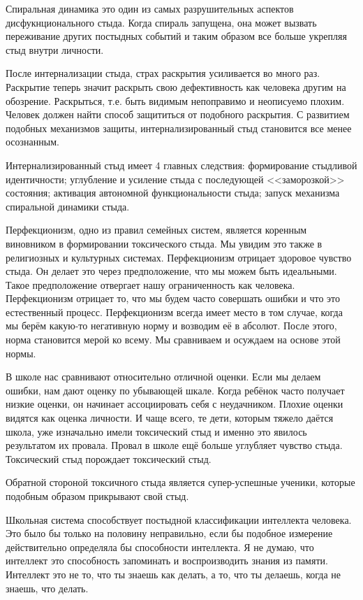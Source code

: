 \documentclass[10pt, fleqn]{article}
\begin{document}
Спиральная динамика это один из самых разрушительных аспектов дисфукнционального стыда. Когда спираль запущена, она может вызвать переживание других постыдных событий и таким образом все больше укрепляя стыд внутри личности.

После интернализации стыда, страх раскрытия усиливается во много раз. Раскрытие теперь значит раскрыть свою дефективность как человека другим на обозрение. Раскрыться, т.е. быть видимым непоправимо и неописуемо плохим. Человек должен найти способ защититься от подобного раскрытия. С развитием подобных механизмов защиты, интернализированный стыд становится все менее осознанным.

Интернализированный стыд имеет 4 главных следствия: формирование стыдливой идентичности; углубление и усиление стыда с последующей <<заморозкой>> состояния; активация автономной функциональности стыда; запуск механизма спиральной динамики стыда.




Перфекционизм, одно из правил семейных систем, является коренным виновником в формировании токсического стыда. Мы увидим это также в религиозных и культурных системах.
Перфекционизм отрицает здоровое чувство стыда. Он делает это через предположение, что мы можем быть идеальными. Такое предположение отвергает нашу ограниченность как человека. Перфекционизм отрицает то, что мы будем часто совершать ошибки и что это естественный процесс.
Перфекционизм всегда имеет место в том случае, когда мы берём какую-то негативную норму и возводим её в абсолют. После этого, норма становится мерой ко всему. Мы сравниваем и осуждаем на основе этой нормы.

В школе нас сравнивают относительно отличной оценки. Если мы делаем ошибки, нам дают оценку по убывающей шкале. Когда ребёнок часто получает низкие оценки, он начинает ассоциировать себя с неудачником. Плохие оценки видятся как оценка личности. И чаще всего, те дети, которым тяжело даётся школа, уже изначально имели токсический стыд и именно это явилось результатом их провала. Провал в школе ещё больше углубляет чувство стыда. Токсический стыд порождает токсический стыд.

Обратной стороной токсичного стыда является супер-успешные ученики, которые подобным образом прикрывают свой стыд.

Школьная система способствует постыдной классификации интеллекта человека. Это было бы только на половину неправильно, если бы подобное измерение действительно определяла бы способности интеллекта. Я не думаю, что интеллект это способность запоминать и воспроизводить знания из памяти. Интеллект это не то, что ты знаешь как делать, а то, что ты делаешь, когда не знаешь, что делать.
\end{document}
